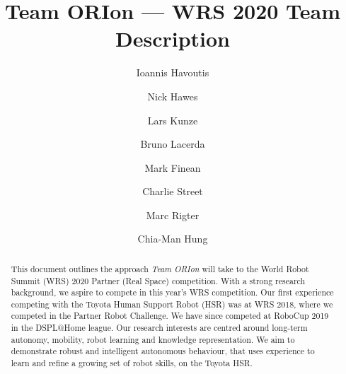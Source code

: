 \documentclass[runningheads,a4paper]{llncs}
\newcommand{\teamori}{Team ORIon}
\begin{document}

\title{\teamori{} --- WRS 2020 Team Description}

\author{Ioannis Havoutis \and Nick Hawes \and Lars Kunze \and Bruno Lacerda 
\and Mark Finean \and Charlie Street \and Marc Rigter \and Chia-Man Hung}

\maketitle


\begin{abstract}
This document outlines the approach \textit{\teamori} will take to the 
World Robot Summit (WRS) 2020 Partner (Real Space) competition. 
With a strong research background, we aspire to compete 
in this year's WRS competition. Our first experience competing with the Toyota Human 
Support Robot (HSR) was at WRS 2018, where we competed in the Partner 
Robot Challenge. We have since competed at RoboCup 2019 in the DSPL@Home league.
Our research interests are centred around long-term
autonomy, mobility, robot learning and knowledge representation. We aim to demonstrate robust and intelligent autonomous behaviour, that uses
experience to learn and refine a growing set of robot skills, on the Toyota
HSR.
\end{abstract}


\end{document}
